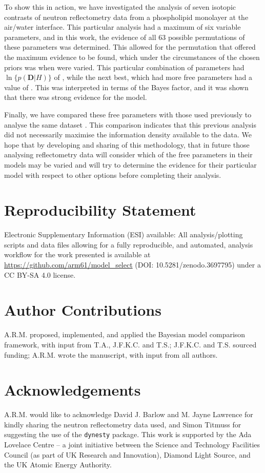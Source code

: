 \documentclass[%
 reprint,
 superscriptaddress,
 amsmath,amssymb,
 aps,
]{revtex4-1}
\begin{document}
To show this in action, we have investigated the analysis of seven isotopic contrasts of neutron reflectometry data from a phospholipid monolayer at the air/water interface. 
This particular analysis had a maximum of six variable parameters, and in this work, the evidence of all \num{63} possible permutations of these parameters was determined. 
This allowed for the permutation that offered the maximum evidence to be found, which under the circumstances of the chosen priors was when  were varied. 
This particular combination of parameters had $\ln\{p(\mathbf{D}|H)\}$ of , while the next best, which had more free parameters had a value of . 
This was interpreted in terms of the Bayes factor, and it was shown that there was strong evidence for the  model.  

Finally, we have compared these free parameters with those used previously to analyse the same dataset \cite{mccluskey_assessing_2019}. 
This comparison indicates that this previous analysis did not necessarily maximise the information density available to the data. 
We hope that by developing and sharing of this methodology, that in future those analysing reflectometry data will consider which of the free parameters in their models may be varied and will try to determine the evidence for their particular model with respect to other options before completing their analysis. 

\section*{Reproducibility Statement}

Electronic Supplementary Information (ESI) available: All analysis/plotting scripts and data files allowing for a fully reproducible, and automated, analysis workflow for the work presented is available at \url{https://github.com/arm61/model\_select} (DOI: 10.5281/zenodo.3697795) under a CC BY-SA 4.0 license.

\section*{Author Contributions}

A.R.M. proposed, implemented, and applied the Bayesian model comparison framework, with input from T.A., J.F.K.C. and T.S.; J.F.K.C. and T.S. sourced funding; A.R.M. wrote the manuscript, with input from all authors.

\section*{Acknowledgements}

A.R.M. would like to acknowledge David J. Barlow and M. Jayne Lawrence for kindly sharing the neutron reflectometry data used, and Simon Titmuss for suggesting the use of the \texttt{dynesty} package.
This work is supported by the Ada Lovelace Centre – a joint initiative between the Science and Technology Facilities Council (as part of UK Research and Innovation), Diamond Light Source, and the UK Atomic Energy Authority.



\end{document}
